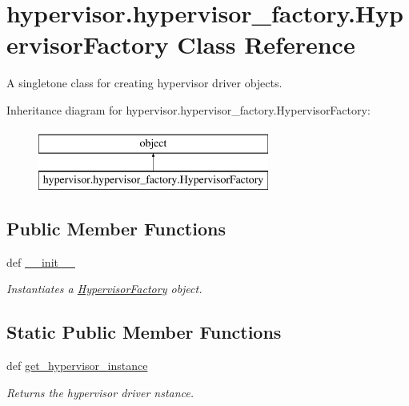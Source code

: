 \hypertarget{classhypervisor_1_1hypervisor__factory_1_1HypervisorFactory}{\section{hypervisor.\-hypervisor\-\_\-factory.\-Hypervisor\-Factory Class Reference}
\label{classhypervisor_1_1hypervisor__factory_1_1HypervisorFactory}
}


A singletone class for creating hypervisor driver objects.  


Inheritance diagram for hypervisor.\-hypervisor\-\_\-factory.\-Hypervisor\-Factory\-:\begin{figure}[H]
\begin{center}
\leavevmode
\includegraphics[height=2.000000cm]{classhypervisor_1_1hypervisor__factory_1_1HypervisorFactory}
\end{center}
\end{figure}
\subsection*{Public Member Functions}
\begin{DoxyCompactItemize}
\item 
def \hyperlink{classhypervisor_1_1hypervisor__factory_1_1HypervisorFactory_ab1691cc3620d76c0a266e0fd469548ad}{\-\_\-\-\_\-init\-\_\-\-\_\-}
\begin{DoxyCompactList}\small\item\em Instantiates a \hyperlink{classhypervisor_1_1hypervisor__factory_1_1HypervisorFactory}{Hypervisor\-Factory} object. \end{DoxyCompactList}\end{DoxyCompactItemize}
\subsection*{Static Public Member Functions}
\begin{DoxyCompactItemize}
\item 
def \hyperlink{classhypervisor_1_1hypervisor__factory_1_1HypervisorFactory_ade4356e4251e644d580f8c1c53fc704e}{get\-\_\-hypervisor\-\_\-instance}
\begin{DoxyCompactList}\small\item\em Returns the hypervisor driver nstance. \end{DoxyCompactList}\end{DoxyCompactItemize}


